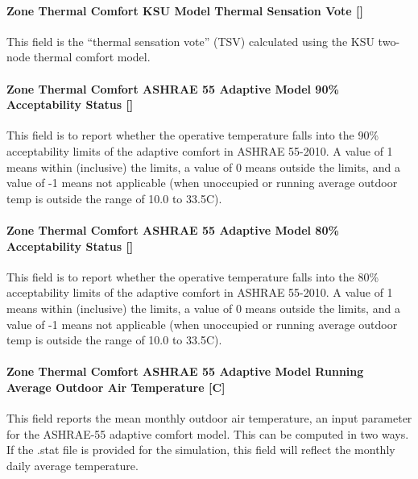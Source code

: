 \paragraph{Zone Thermal Comfort KSU Model Thermal Sensation Vote {[]}}\label{zone-thermal-comfort-ksu-model-thermal-sensation-vote}

This field is the ``thermal sensation vote'' (TSV) calculated using the KSU two-node thermal comfort model.

\paragraph{Zone Thermal Comfort ASHRAE 55 Adaptive Model 90\% Acceptability Status {[]}}\label{zone-thermal-comfort-ashrae-55-adaptive-model-90-acceptability-status}

This field is to report whether the operative temperature falls into the 90\% acceptability limits of the adaptive comfort in ASHRAE 55-2010. A value of 1 means within (inclusive) the limits, a value of 0 means outside the limits, and a value of -1 means not applicable (when unoccupied or running average outdoor temp is outside the range of 10.0 to 33.5C).

\paragraph{Zone Thermal Comfort ASHRAE 55 Adaptive Model 80\% Acceptability Status {[]}}\label{zone-thermal-comfort-ashrae-55-adaptive-model-80-acceptability-status}

This field is to report whether the operative temperature falls into the 80\% acceptability limits of the adaptive comfort in ASHRAE 55-2010. A value of 1 means within (inclusive) the limits, a value of 0 means outside the limits, and a value of -1 means not applicable (when unoccupied or running average outdoor temp is outside the range of 10.0 to 33.5C).

\paragraph{Zone Thermal Comfort ASHRAE 55 Adaptive Model Running Average Outdoor Air Temperature {[}C{]}}\label{zone-thermal-comfort-ashrae-55-adaptive-model-running-average-outdoor-air-temperature-c}

This field reports the mean monthly outdoor air temperature, an input parameter for the ASHRAE-55 adaptive comfort model. This can be computed in two ways. If the .stat file is provided for the simulation, this field will reflect the monthly daily average temperature.

